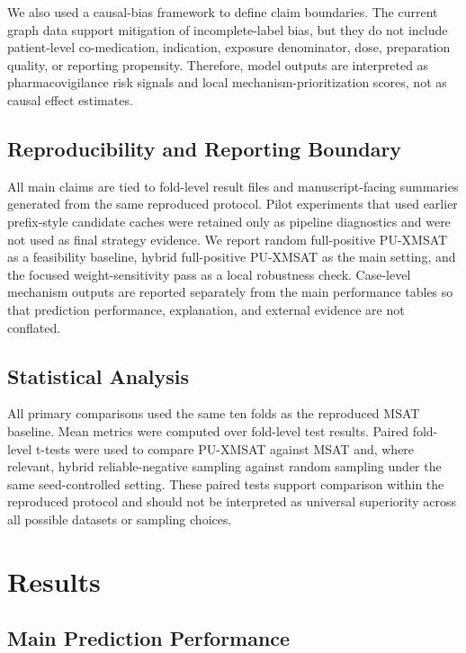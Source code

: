 \documentclass[manuscript,screen,review]{acmart}
\newcommand{\msat}{MSAT}
\newcommand{\px}{PU-XMSAT}
\begin{document}
We also used a causal-bias framework to define claim boundaries. The current graph data support mitigation of incomplete-label bias, but they do not include patient-level co-medication, indication, exposure denominator, dose, preparation quality, or reporting propensity. Therefore, model outputs are interpreted as pharmacovigilance risk signals and local mechanism-prioritization scores, not as causal effect estimates.

\subsection{Reproducibility and Reporting Boundary}

All main claims are tied to fold-level result files and manuscript-facing summaries generated from the same reproduced protocol. Pilot experiments that used earlier prefix-style candidate caches were retained only as pipeline diagnostics and were not used as final strategy evidence. We report random full-positive PU-XMSAT as a feasibility baseline, hybrid full-positive PU-XMSAT as the main setting, and the focused weight-sensitivity pass as a local robustness check. Case-level mechanism outputs are reported separately from the main performance tables so that prediction performance, explanation, and external evidence are not conflated.

\subsection{Statistical Analysis}

All primary comparisons used the same ten folds as the reproduced \msat{} baseline. Mean metrics were computed over fold-level test results. Paired fold-level t-tests were used to compare \px{} against \msat{} and, where relevant, hybrid reliable-negative sampling against random sampling under the same seed-controlled setting. These paired tests support comparison within the reproduced protocol and should not be interpreted as universal superiority across all possible datasets or sampling choices.

\section{Results}

\subsection{Main Prediction Performance}
\end{document}
